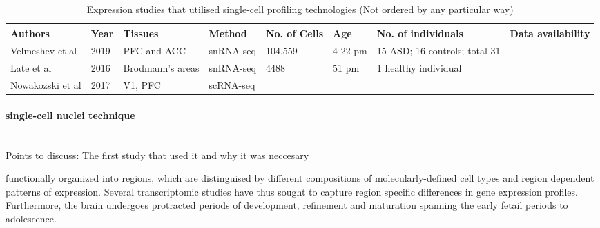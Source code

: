 \documentclass[12pt]{article}
\begin{document}
\begin{landscape}

\begin{table}[!htp]
	\centering
	\footnotesize
	\caption{Expression studies that utilised single-cell profiling technologies (Not ordered by any particular way)}
	\begin{tabular}{|l|l|l|l|l|l|l|l|}
		\hline
		\textbf{Authors} &\textbf{Year}  & \textbf{Tissues} & \textbf{Method} & \textbf{No. of Cells}  & \textbf{Age} &  \textbf{No. of individuals} & \textbf{Data availability}  \\ \hline
		Velmeshev et al & 2019  &  PFC and ACC  & snRNA-seq  & 104,559 & 4-22 pm &15 ASD; 16 controls; total 31&  \\ \hline
		Late et al& 2016  & Brodmann's areas  & snRNA-seq & 4488 &51 pm & 1 healthy individual &  \\ \hline
		Nowakozski et al & 2017 &V1, PFC & scRNA-seq     & &&& \\ \hline
	\end{tabular}
\end{table}
\end{landscape}


\paragraph{single-cell nuclei technique}

~\\ Points to discuss: The first study that used it and why it was neccesary 




 functionally organized into regions, which are distinguised by different compositions of molecularly-defined cell types and region dependent patterns of expression. Several transcriptomic studies have thus sought to capture region specific differences in gene expression profiles. Furthermore, the brain undergoes protracted periods of development, refinement and maturation spanning the early fetail periods to adolescence. 
\end{document}

